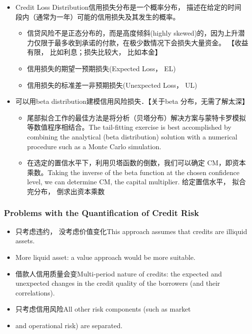 \begin{itemize}
    \item Credit Loss Distribution信用损失分布是一个概率分布， 描述在给定的时间
    段内（通常为一年）可能的信用损失及其发生的概率。
    \begin{itemize}

    \item  信贷风险不是正态分布的，而是高度倾斜(highly skewed)的，因为上升潜力仅限于最多收到承诺的付款，在极少数情况下会损失大量资金。 【收益有限，
    比如利息；损失比较大， 比如本金】
    \item  信用损失的期望一预期损失(Expected Loss， EL)
    \item  信用损失的标准差一非预期损失(Unexpected Loss， UL)
\end{itemize}

    \item 可以用beta distribution建模信用风险损失．【关于beta 分布，无需了解太深】
    \begin{itemize}
        \item  尾部拟合工作的最佳方法是将分析（贝塔分布）解决方案与蒙特卡罗模拟等数值程序相结合。The tail-fitting exercise is best accomplished by combining the analytical (beta distribution) solution with a numerical
        procedure such as a Monte Carlo simulation.
        \item   在选定的置信水平下，利用贝塔函数的倒数，我们可以确定 CM，即资本乘数。Taking the inverse of the beta function at the chosen confidence level, we can determine CM, the capital multiplier. 给定置信水平， 拟合完分布， 倒求出资本乘数

    \end{itemize}

\end{itemize}


\subsubsection{Problems with the Quantification of Credit Risk}
\begin{itemize}
    \item 只考虑违约， 没考虑价值变化This approach assumes that
credits are illiquid assets.
\item  More liquid asset: a value approach would be more
suitable.
\item  借款人信用质量会变Multi-period nature of credits: the
expected and unexpected changes in the credit quality of the
borrowers (and their correlations).
\item  只考虑信用风险All other risk components (such as market
\item  and operational risk) are separated.
\end{itemize}




